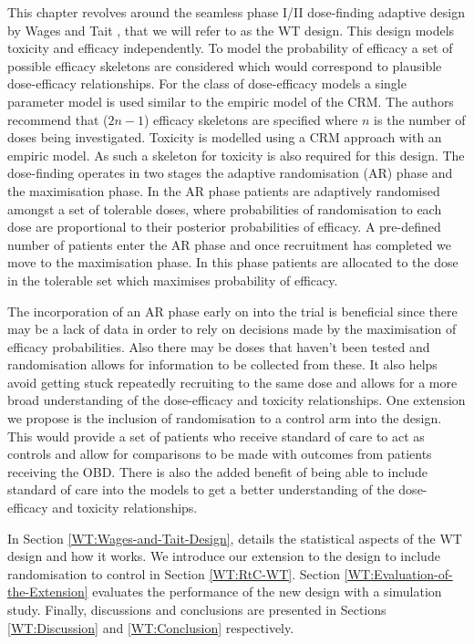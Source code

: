 This chapter revolves around the seamless phase \RN{1}/\RN{2} dose-finding adaptive design by Wages and Tait \cite{wagesSeamlessPhaseII2015}, that we will refer to as the WT design. This design models toxicity and efficacy independently. To model the probability of efficacy a set of possible efficacy skeletons are considered which would correspond to plausible dose-efficacy relationships. For the class of dose-efficacy models a single parameter model is used similar to the empiric model of the CRM. The authors recommend that ($2n - 1$) efficacy skeletons are specified where $n$ is the number of doses being investigated. Toxicity is modelled using a CRM approach with an empiric model. As such a skeleton for toxicity is also required for this design. The dose-finding operates in two stages the adaptive randomisation (AR) phase and the maximisation phase. In the AR phase patients are adaptively randomised amongst a set of tolerable doses, where probabilities of randomisation to each dose are proportional to their posterior probabilities of efficacy. A pre-defined number of patients enter the AR phase and once recruitment has completed we move to the maximisation phase. In this phase patients are allocated to the dose in the tolerable set which maximises probability of efficacy.  

The incorporation of an AR phase early on into the trial is beneficial since there may be a lack of data in order to rely on decisions made by the maximisation of efficacy probabilities. Also there may be doses that haven't been tested and randomisation allows for information to be collected from these. It also helps avoid getting stuck repeatedly recruiting to the same dose and allows for a more broad understanding of the dose-efficacy and toxicity relationships. One extension we propose is the inclusion of randomisation to a control arm into the design. This would provide a set of patients who receive standard of care to act as controls and allow for comparisons to be made with outcomes from patients receiving the OBD. There is also the added benefit of being able to include standard of care into the models to get a better understanding of the dose-efficacy and toxicity relationships.  

In Section \ref{WT:Wages-and-Tait-Design}, details the statistical aspects of the WT design and how it works. We introduce our extension to the design to include randomisation to control in Section \ref{WT:RtC-WT}. Section \ref{WT:Evaluation-of-the-Extension} evaluates the performance of the new design with a simulation study. Finally, discussions and conclusions are presented in Sections \ref{WT:Discussion} and \ref{WT:Conclusion} respectively.  


